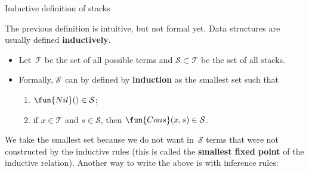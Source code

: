 %
\begin{frame}{Inductive definition of stacks}

  The previous definition is intuitive, but not formal yet.  Data
  structures are usually defined \textbf{inductively}.
  \begin{itemize}

    \item Let~\(\mathcal{T}\) be the set of all possible terms and
      \(\mathcal{S} \subset \mathcal{T}\) be the set of all stacks.

    \item Formally, \(\mathcal{S}\)~can by defined by
      \textbf{induction} as the smallest set such that
      \begin{enumerate}

        \item $\fun{Nil}() \in \mathcal{S}$;

        \item if \(x \in \mathcal{T}\) and \(s \in \mathcal{S}\), then
          \(\fun{Cons}(x,s) \in \mathcal{S}\).
      \end{enumerate}

  \end{itemize}

   We take the smallest set because we do not want in~\(\mathcal{S}\)
   terms that were not constructed by the inductive rules (this is
   called the \textbf{smallest fixed point} of the inductive
   relation). Another way to write the above is with inference rules:

\end{frame}

